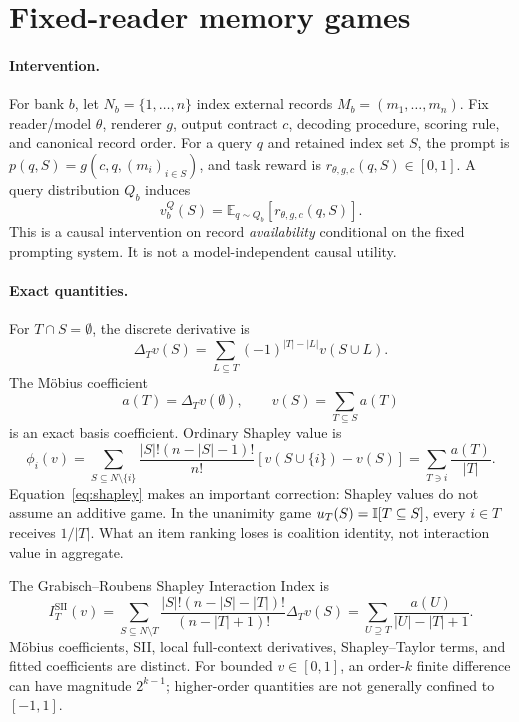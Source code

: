 \section{Fixed-reader memory games}
\label{sec:formulation}

\paragraph{Intervention.}
For bank \(b\), let \(N_b=\{1,\ldots,n\}\) index external records
\(M_b=(m_1,\ldots,m_n)\). Fix reader/model \(\theta\), renderer \(g\), output
contract \(c\), decoding procedure, scoring rule, and canonical record order. For a
query \(q\) and retained index set \(S\), the prompt is
\(p(q,S)=g(c,q,(m_i)_{i\in S})\), and task reward is
\(r_{\theta,g,c}(q,S)\in[0,1]\). A query distribution \(Q_b\) induces
\begin{equation}
v_b^Q(S)=\mathbb{E}_{q\sim Q_b}[r_{\theta,g,c}(q,S)].
\label{eq:game}
\end{equation}
This is a causal intervention on record \emph{availability} conditional on the fixed
prompting system. It is not a model-independent causal utility.

\paragraph{Exact quantities.}
For \(T\cap S=\emptyset\), the discrete derivative is
\begin{equation}
\Delta_Tv(S)=\sum_{L\subseteq T}(-1)^{|T|-|L|}v(S\cup L).
\end{equation}
The M\"obius coefficient
\begin{equation}
a(T)=\Delta_Tv(\emptyset),\qquad
v(S)=\sum_{T\subseteq S}a(T)
\label{eq:mobius}
\end{equation}
is an exact basis coefficient. Ordinary Shapley value is
\begin{equation}
\phi_i(v)=\sum_{S\subseteq N\setminus\{i\}}
\frac{|S|!(n-|S|-1)!}{n!}\left[v(S\cup\{i\})-v(S)\right]
=\sum_{T\ni i}\frac{a(T)}{|T|}.
\label{eq:shapley}
\end{equation}
Equation~\ref{eq:shapley} makes an important correction: Shapley values do not
assume an additive game. In the unanimity game
\(u_T(S)=\mathbb{I}[T\subseteq S]\), every \(i\in T\) receives \(1/|T|\).
What an item ranking loses is coalition identity, not interaction value in aggregate.

The Grabisch--Roubens Shapley Interaction Index is
\begin{equation}
I_T^{\mathrm{SII}}(v)
=\sum_{S\subseteq N\setminus T}
\frac{|S|!(n-|S|-|T|)!}{(n-|T|+1)!}\Delta_Tv(S)
=\sum_{U\supseteq T}\frac{a(U)}{|U|-|T|+1}.
\label{eq:sii}
\end{equation}
M\"obius coefficients, SII, local full-context derivatives, Shapley--Taylor terms,
and fitted coefficients are distinct. For bounded \(v\in[0,1]\), an order-\(k\)
finite difference can have magnitude \(2^{k-1}\); higher-order quantities are not
generally confined to \([-1,1]\).

